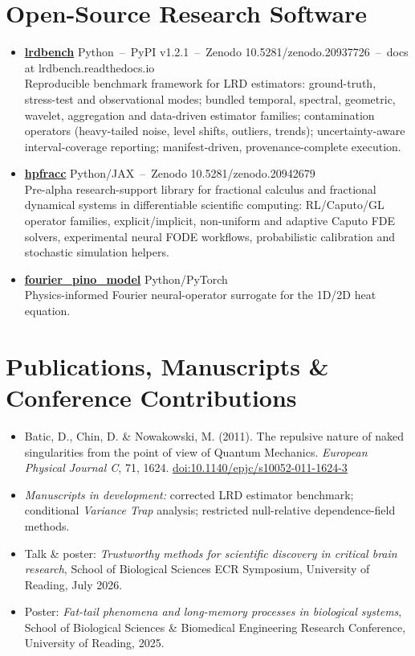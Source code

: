 \documentclass[10pt,a4paper]{article}
\newcommand{\tag}[1]{{\small\color{muted}#1}}
\begin{document}
\section{Open-Source Research Software}
\begin{itemize}[leftmargin=1.3em,itemsep=2pt,topsep=2pt]
  \item \textbf{\href{https://github.com/dave2k77/lrdbench}{lrdbench}} \tag{Python \,--\, PyPI v1.2.1 \,--\, Zenodo 10.5281/zenodo.20937726 \,--\, docs at lrdbench.readthedocs.io}\\
  Reproducible benchmark framework for LRD estimators: ground-truth, stress-test and observational modes; bundled temporal, spectral, geometric, wavelet, aggregation and data-driven estimator families; contamination operators (heavy-tailed noise, level shifts, outliers, trends); uncertainty-aware interval-coverage reporting; manifest-driven, provenance-complete execution.
  \item \textbf{\href{https://github.com/dave2k77/hpfracc}{hpfracc}} \tag{Python/JAX \,--\, Zenodo 10.5281/zenodo.20942679}\\
  Pre-alpha research-support library for fractional calculus and fractional dynamical systems in differentiable scientific computing: RL/Caputo/GL operator families, explicit/implicit, non-uniform and adaptive Caputo FDE solvers, experimental neural FODE workflows, probabilistic calibration and stochastic simulation helpers.
  \item \textbf{\href{https://github.com/dave2k77/fourier_pino_model}{fourier\_pino\_model}} \tag{Python/PyTorch}\\
  Physics-informed Fourier neural-operator surrogate for the 1D/2D heat equation.
\end{itemize}

\section{Publications, Manuscripts \& Conference Contributions}
\begin{itemize}[leftmargin=1.3em,itemsep=2pt,topsep=2pt]
  \item Batic, D., Chin, D. \& Nowakowski, M. (2011). The repulsive nature of naked singularities from the point of view of Quantum Mechanics. \emph{European Physical Journal C}, 71, 1624. \href{https://doi.org/10.1140/epjc/s10052-011-1624-3}{doi:10.1140/epjc/s10052-011-1624-3}
  \item \emph{Manuscripts in development:} corrected LRD estimator benchmark; conditional \emph{Variance Trap} analysis; restricted null-relative dependence-field methods.
  \item Talk \& poster: \emph{Trustworthy methods for scientific discovery in critical brain research}, School of Biological Sciences ECR Symposium, University of Reading, July 2026.
  \item Poster: \emph{Fat-tail phenomena and long-memory processes in biological systems}, School of Biological Sciences \& Biomedical Engineering Research Conference, University of Reading, 2025.
\end{itemize}
\end{document}
